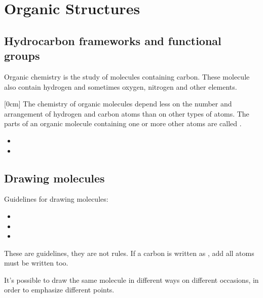 \newcommand*{\pathtwo}{chapters/chapter2}

\section{Organic Structures}


\subsection{Hydrocarbon frameworks and functional groups}

Organic chemistry is the study of molecules containing carbon. These molecule also contain hydrogen and sometimes oxygen, nitrogen and other elements.

[0cm] 
The chemistry of organic molecules depend less on the number and arrangement of hydrogen and carbon atoms than on other types of atoms. The parts of an organic molecule containing one or more other atoms are called .
\begin{itemize}
    \item {}
    \item {}
\end{itemize}


\subsection{Drawing molecules}

Guidelines for drawing molecules:
\begin{itemize}
    \item {}
    \item {}
    \item {}
\end{itemize}
These are guidelines, they are not rules. If a carbon is written as , add all  atoms must be written too.

It's possible to draw the same molecule in different ways on different occasions, in order to emphasize different points.


